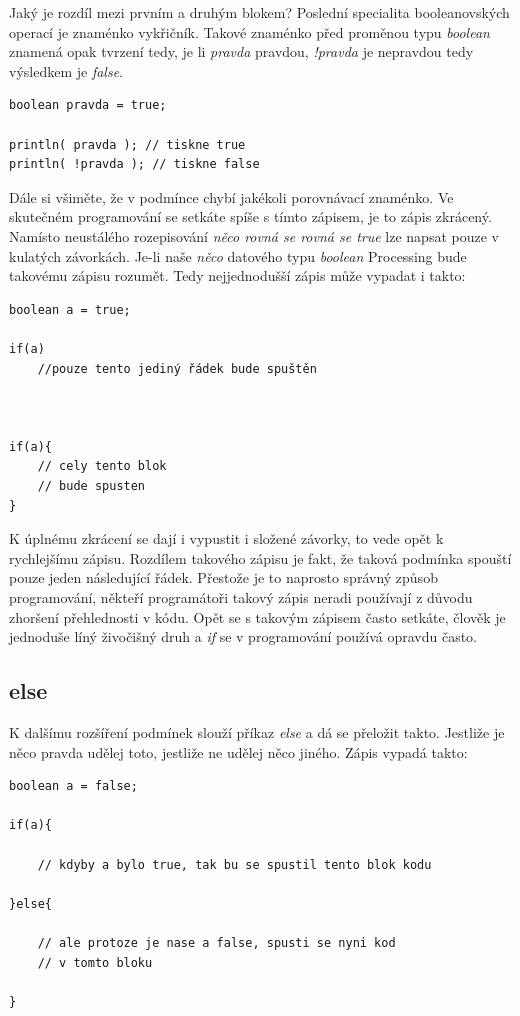 \documentclass[10pt]{book}
\newcommand{\pododdil}[1]{\subsection{#1}\index{#1}\label{#1}}
\newcommand{\vyraz}[1]{\textit{\gls{#1}}\index{#1}\label{#1}}
\begin{document}
Jaký je rozdíl mezi prvním a druhým blokem? Poslední specialita booleanovských operací je znaménko vykřičník. Takové znaménko před proměnou typu \vyraz{boolean} znamená opak tvrzení tedy, je li {\em pravda} pravdou, {\em !pravda} \label{!pravda} je nepravdou tedy výsledkem je \vyraz{false}.


\begin{lstlisting}
boolean pravda = true;

println( pravda ); // tiskne true
println( !pravda ); // tiskne false
\end{lstlisting}



Dále si všiměte, že v podmínce chybí jakékoli porovnávací znaménko. Ve skutečném programování se setkáte spíše s tímto zápisem, je to zápis zkrácený. Namísto neustálého rozepisování {\em něco rovná se rovná se \vyraz{true}} lze napsat pouze v kulatých závorkách. Je-li naše {\em něco} datového typu \vyraz{boolean} Processing bude takovému zápisu rozumět. Tedy nejjednodušší zápis může vypadat i takto:

  
\begin{lstlisting}
boolean a = true;

if(a)
	//pouze tento jediný řádek bude spuštěn
	
	
	
if(a){
	// cely tento blok
	// bude spusten
}
\end{lstlisting}

K úplnému zkrácení se dají i vypustit i složené závorky, to vede opět k rychlejšímu zápisu. Rozdílem takového zápisu je fakt, že taková podmínka spouští pouze jeden následující řádek. Přestože je to naprosto správný způsob programování, někteří programátoři takový zápis neradi používají z důvodu zhoršení přehlednosti v kódu. Opět se s takovým zápisem často setkáte, člověk je jednoduše líný živočišný druh a \vyraz{if} se v programování používá opravdu často.

\pododdil{else}

K dalšímu rozšíření podmínek slouží příkaz \vyraz{else} a dá se přeložit takto. Jestliže je něco pravda udělej toto, jestliže ne udělej něco jiného. Zápis vypadá takto:

\begin{lstlisting}
boolean a = false;

if(a){

	// kdyby a bylo true, tak bu se spustil tento blok kodu 

}else{

	// ale protoze je nase a false, spusti se nyni kod
	// v tomto bloku
	
}
\end{lstlisting}
\end{document}
